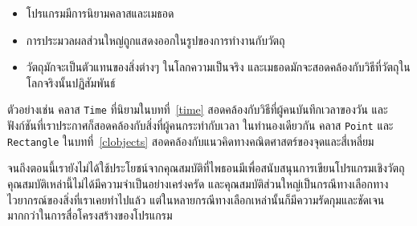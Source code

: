 \begin{itemize}

\item โปรแกรมมีการนิยามคลาสและเมธอด

\item การประมวลผลส่วนใหญ่ถูกแสดงออกในรูปของการทำงานกับวัตถุ

\item วัตถุมักจะเป็นตัวแทนของสิ่งต่างๆ ในโลกความเป็นจริง และเมธอดมักจะสอดคล้องกับวิธีที่วัตถุในโลกจริงนั้นปฏิสัมพันธ์

\end{itemize}


ตัวอย่างเช่น คลาส {\tt Time} ที่นิยามในบทที่~\ref{time} สอดคล้องกับวิธีที่ผู้คนบันทึกเวลาของวัน 
และฟังก์ชันที่เราประกาศก็สอดคล้องกับสิ่งที่ผู้คนกระทำกับเวลา 
ในทำนองเดียวกัน คลาส {\tt Point} และ {\tt Rectangle} ในบทที่~\ref{clobjects} สอดคล้องกับแนวคิดทางคณิตศาสตร์ของจุดและสี่เหลี่ยม



จนถึงตอนนี้เรายังไม่ได้ใช้ประโยชน์จากคุณสมบัติที่ไพธอนมีเพื่อสนับสนุนการเขียนโปรแกรมเชิงวัตถุ 
คุณสมบัติเหล่านี้ไม่ได้มีความจำเป็นอย่างเคร่งครัด และคุณสมบัติส่วนใหญ่เป็นกรณีทางเลือกทางไวยากรณ์ของสิ่งที่เราเคยทำไปแล้ว 
แต่ในหลายกรณีทางเลือกเหล่านั้นก็มีความรัดกุมและชัดเจนมากกว่าในการสื่อโครงสร้างของโปรแกรม



